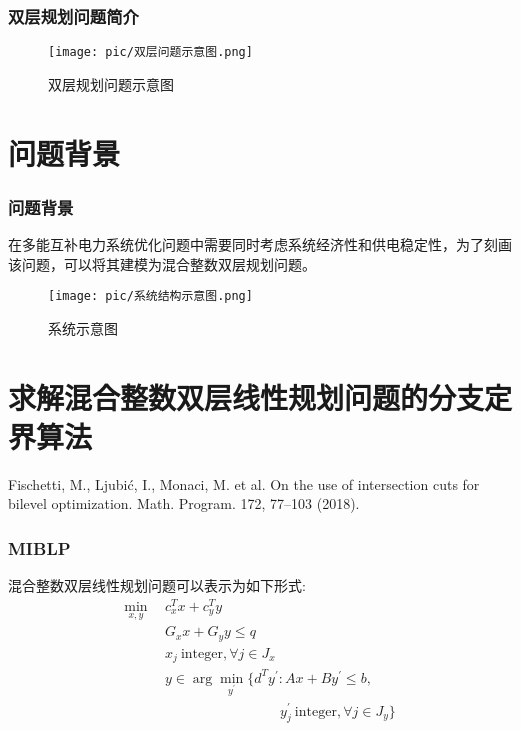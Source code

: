 \documentclass[10pt]{beamer}
\begin{document}
\begin{frame}
	\frametitle{双层规划问题简介}
	\begin{figure}
		\centering
		\texttt{[image: pic/双层问题示意图.png]}
		\caption{双层规划问题示意图}
	\end{figure}
\end{frame}

\section{问题背景}

\begin{frame}
	\frametitle{问题背景} 
	在多能互补电力系统优化问题中需要同时考虑系统经济性和供电稳定性，为了刻画该问题，可以将其建模为混合整数双层规划问题。
	\begin{figure}
		\centering
		\texttt{[image: pic/系统结构示意图.png]}
		\caption{系统示意图}
	\end{figure}
\end{frame}

\section{求解混合整数双层线性规划问题的分支定界算法} 

\begin{frame}
	Fischetti, M., Ljubić, I., Monaci, M. et al. On the use of intersection cuts for bilevel optimization. Math. Program. 172, 77–103 (2018). 
\end{frame}

\begin{frame}
	\frametitle{MIBLP}
	混合整数双层线性规划问题可以表示为如下形式:
	\begin{equation}
		\begin{aligned}
			\min_{x,y}~~&c_{x}^{T}x+c_{y}^{T}y \\
			&G_xx+G_yy \leq q  \\
			&x_{j}\mathrm{~integer}, \forall j\in J_{x}  \\
			&y\in\operatorname{arg}\operatorname*{min}_{y^{\prime}}\{d^{T}y^{\prime}:Ax+By^{\prime}\le b,\\
			&\qquad\qquad\qquad\qquad~ y_{j}^{\prime}\mathrm{~integer}, \forall j\in J_{y}\}
		\end{aligned}
	\end{equation}


\end{frame}
\end{document}
